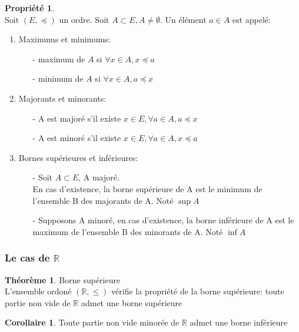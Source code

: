 \documentclass[fleqn]{article}
\theoremstyle{definition} \newtheorem*{defi}{D\'efinition}
\theoremstyle{definition} \newtheorem*{theo}{Th\'eor\`eme}
\theoremstyle{definition} \newtheorem*{coro}{Corollaire}
\theoremstyle{remark} \newtheorem*{rqs}{Remarques}
\theoremstyle{definition} \newtheorem*{prop}{Propri\'et\'e}
\begin{document}
\begin{prop} $ $ \\ Soit \((E, \preceq)\) un ordre. Soit \(A \subset E, A \neq \emptyset\). Un \'el\'ement \(a \in A\) est appel\'e:
	\begin{enumerate}
		\item Maximums et minimums:
			\begin{itemize}
				\item [-] maximum de \(A\) si \(\forall x \in A, x \preceq a\)
				\item [-] minimum de \(A\) si \(\forall x \in A, a \preceq x\)
			\end{itemize}
		\item Majorants et minorants:
			\begin{itemize}
				\item [-] A est major\'e s'il existe \(x \in E, \forall a \in A, a \preceq x\)
				\item [-] A est minor\'e s'il existe \(x \in E, \forall a \in A, x \preceq a\)
			\end{itemize}
		\item Bornes sup\'erieures et inf\'erieures:
			\begin{itemize}
				\item [-] Soit \(A \subset E\), A major\'e. \\
					En cas d'existence, la borne sup\'erieure de A est le minimum de l'ensemble B des majorants de A. Not\'e $\sup A$
				\item [-] Supposons A minor\'e, en cas d'existence, la borne inf\'erieure de A est le maximum de l'ensemble B des minorants de A.
					Not\'e $\inf A$ \\
			\end{itemize}
	\end{enumerate}
\end{prop}

\subsubsection{Le cas de $\mathbb{R}$}
\begin{theo} Borne sup\'erieure \\
	L'ensemble ordon\'e $(\mathbb{R}, \leq)$ v\'erifie la propri\'et\'e de la borne sup\'erieure: toute partie non vide de $\mathbb{R}$
	admet une borne sup\'erieure
\end{theo}

\begin{coro}
	Toute partie non vide minor\'ee de $\mathbb{R}$ admet une borne inf\'erieure
\end{coro}
\end{document}
